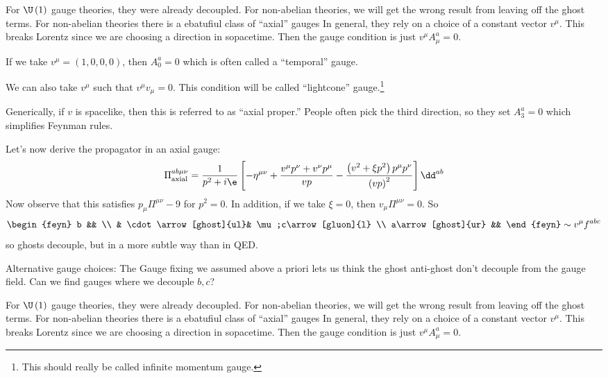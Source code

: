 \documentclass{booc}
\begin{document}
For $\U\left( 1 \right)$ gauge theories, they were already decoupled.
For non-abelian theories, we will get the wrong result from leaving off
the ghost terms.
For non-abelian theories there is a ebatufiul class of ``axial'' gauges
In general, they rely on a choice of a constant vector $v^\mu$.
This breaks Lorentz since we are choosing a direction in sopacetime. 
Then the gauge condition is just
$v^\mu A_\mu^a = 0$. 

\begin{exm}
If we take $v^\mu = \left( 1, 0,0,0 \right)$, then 
$A_0^a = 0$ which is often called a ``temporal'' gauge.

We can also take $v^\mu$ such that $v^\mu v_\mu = 0$. 
This condition will be called ``lightcone'' gauge.\footnote{
This should really be called infinite momentum gauge.}

Generically, if $v$ is spacelike, then this is referred to as ``axial proper.''
People often pick the third direction, so they set $A_3^a = 0$ which simplifies 
Feynman rules. 
\end{exm}

Let's now derive the propagator in an axial gauge:
\begin{equation}
\Pi^{ab\mu\nu}_{\text{axial}} = 
\frac{1}{p^2 + i\e}
\left[ -\eta^{\mu\nu}+ 
\frac{v^\mu p^\nu + v^\nu p^\mu}{vp} - 
\frac{\left( v^2 + \xi p^2 \right)p^\mu p^\nu}{\left( vp \right)^2}\right]\dd^{ab}
\end{equation}
Now observe that this satisfies
$p_\mu \Pi^{\mu\nu} - 9$ for $p^2 = 0$. 
In addition, if we take $\xi = 0$, then $v_\mu \Pi^{\mu\nu} = 0$. 
So
\begin{equation}
\begin{feyn}
b && \\
& \cdot\arrow[ghost]{ul}&
\mu;c\arrow[gluon]{l} \\
a\arrow[ghost]{ur} &&
\end{feyn}\sim
v^\mu f^{abc}
\end{equation}
so ghosts decouple, but in a more subtle way than in QED.

Alternative gauge choices:
The Gauge fixing we assumed above a priori lets us think
the ghost anti-ghost don't decouple from
the gauge field. 
Can we find gauges where we decouple $b,c$?

For $\U\left( 1 \right)$ gauge theories, they were already decoupled.
For non-abelian theories, we will get the wrong result from leaving off
the ghost terms.
For non-abelian theories there is a ebatufiul class of ``axial'' gauges
In general, they rely on a choice of a constant vector $v^\mu$.
This breaks Lorentz since we are choosing a direction in sopacetime. 
Then the gauge condition is just
$v^\mu A_\mu^a = 0$. 
\end{document}
